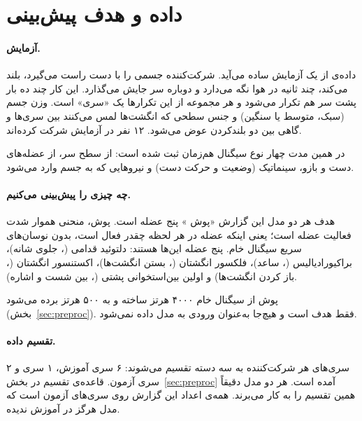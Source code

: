 \FloatBarrier
\section{داده و هدف پیش‌بینی}

\paragraph{آزمایش.} داده‌ی  \cite{luciw2014} از یک آزمایش ساده می‌آید. شرکت‌کننده جسمی را با دست راست می‌گیرد، بلند می‌کند، چند ثانیه در هوا نگه می‌دارد و دوباره سر جایش می‌گذارد. این کار چند ده بار پشت سر هم تکرار می‌شود و هر مجموعه از این تکرارها یک «سری» است. وزن جسم (سبک، متوسط یا سنگین) و جنس سطحی که انگشت‌ها لمس می‌کنند بین سری‌ها و گاهی بین دو بلندکردن عوض می‌شود. ۱۲ نفر در آزمایش شرکت کرده‌اند.

در همین مدت چهار نوع سیگنال هم‌زمان ثبت شده است:  از سطح سر،  از عضله‌های دست و بازو، سینماتیک (وضعیت و حرکت دست) و نیروهایی که به جسم وارد می‌شود.

\paragraph{چه چیزی را پیش‌بینی می‌کنیم.} هدف هر دو مدل این گزارش «پوش » پنج عضله است. پوش، منحنی هموار شدت فعالیت عضله است؛ یعنی اینکه عضله در هر لحظه چقدر فعال است، بدون نوسان‌های سریع سیگنال خام. پنج عضله این‌ها هستند: دلتوئید قدامی (، جلوی شانه)، براکیورادیالیس (، ساعد)، فلکسور انگشتان (، بستن انگشت‌ها)، اکستنسور انگشتان (، باز کردن انگشت‌ها) و اولین بین‌استخوانی پشتی (، بین شست و اشاره).

پوش از سیگنال خام ۴۰۰۰ هرتز ساخته و به ۵۰۰ هرتز برده می‌شود (بخش~\ref{sec:preproc}).  فقط هدف است و هیچ‌جا به‌عنوان ورودی به مدل داده نمی‌شود.

\paragraph{تقسیم داده.} سری‌های هر شرکت‌کننده به سه دسته تقسیم می‌شوند: ۶ سری آموزش، ۱ سری  و ۲ سری آزمون. قاعده‌ی تقسیم در بخش~\ref{sec:preproc} آمده است. هر دو مدل دقیقاً همین تقسیم را به کار می‌برند. همه‌ی اعداد این گزارش روی سری‌های آزمون است که مدل هرگز در آموزش ندیده.

